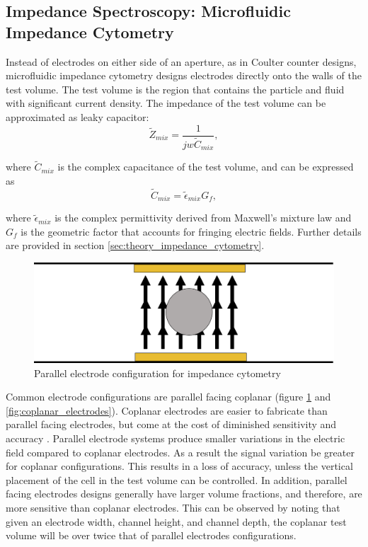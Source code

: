  \subsection*{Impedance Spectroscopy: Microfluidic Impedance Cytometry}
 \par Instead of electrodes on either side of an aperture, as in Coulter counter designs, microfluidic impedance cytometry designs electrodes directly onto the walls of the test volume. The test volume is the region that contains the particle and fluid with significant current density. The impedance of the test volume can be approximated as leaky capacitor:
 \begin{equation}
       \tilde{Z}_{mix} = \frac{1}{jw\tilde{C}_{mix}},
    \label{eqn:impedance_with_cap}
 \end{equation}
 
 \noindent where $\tilde{C}_{mix}$ is the complex capacitance of the test volume, and can be expressed as
 \begin{equation}
     \tilde{C}_{mix} = \tilde{\epsilon}_{mix}G_f,
 \end{equation}
 
 \noindent where $\tilde{\epsilon}_{mix}$ is the complex permittivity derived from Maxwell's mixture law and $G_f$ is the geometric factor that accounts for fringing electric fields. Further details are provided in section \ref{sec:theory_impedance_cytometry}.
 
 \begin{figure}[ht]
     \centering
     \includegraphics[width=\textwidth]{images/parallel.png}
     \caption{Parallel electrode configuration for impedance cytometry}
     \label{fig:parallel_electrodes}
 \end{figure}
 
 \par Common electrode configurations are parallel facing coplanar (figure \ref{fig:parallel_electrodes} and \ref{fig:coplanar_electrodes}). Coplanar electrodes are easier to fabricate than parallel facing electrodes, but come at the cost of diminished sensitivity and accuracy \cite{sun_analytical_2007}. Parallel electrode systems produce smaller variations in the electric field compared to coplanar electrodes. As a result the signal variation be greater for coplanar configurations. This results in a loss of accuracy, unless the vertical placement of the cell in the test volume can be controlled. In addition, parallel facing electrodes designs generally have larger volume fractions, and therefore, are more sensitive than coplanar electrodes. This can be observed by noting that given an electrode width, channel height, and channel depth, the coplanar test volume will be over twice that of parallel electrodes configurations.
  
